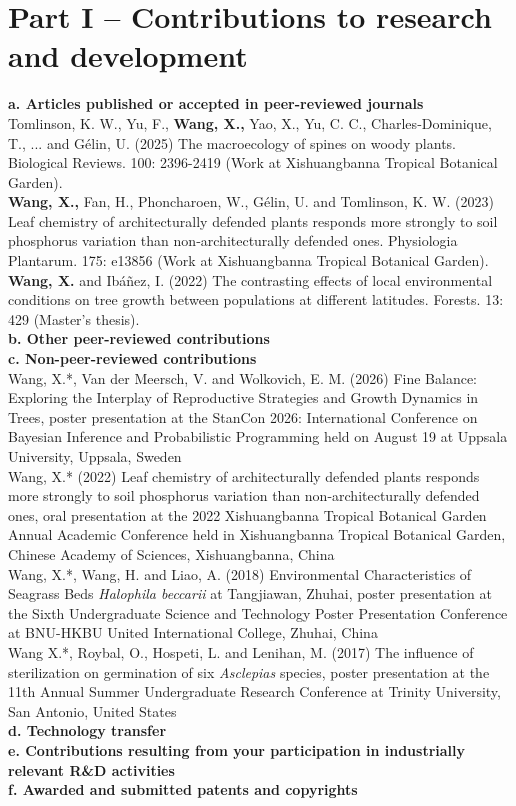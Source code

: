 \documentclass[12pt]{article}
\begin{document}
\section*{Part I – Contributions to research and development}
\textbf{a. Articles published or accepted in peer-reviewed journals}\\
\medskip
Tomlinson, K. W., Yu, F., \textbf{Wang, X.,} Yao, X., Yu, C. C., Charles‐Dominique, T., ... and Gélin, U. (2025) The macroecology of spines on woody plants. Biological Reviews. 100: 2396-2419 (Work at Xishuangbanna Tropical Botanical Garden). \\
\medskip
\textbf{Wang, X.,} Fan, H., Phoncharoen, W., Gélin, U. and Tomlinson, K. W. (2023) Leaf chemistry of architecturally defended plants responds more strongly to soil phosphorus variation than non‐architecturally defended ones. Physiologia Plantarum. 175: e13856 (Work at Xishuangbanna Tropical Botanical Garden).\\
\medskip
\textbf{Wang, X.} and Ibáñez, I. (2022) The contrasting effects of local environmental conditions on tree growth between populations at different latitudes. Forests. 13: 429 (Master's thesis).\\
\medskip
\textbf{b. Other peer-reviewed contributions}\\
\textbf{c. Non-peer-reviewed contributions}\\
\medskip
Wang, X.*, Van der Meersch, V. and Wolkovich, E. M. (2026) Fine Balance: Exploring the Interplay of Reproductive Strategies and Growth Dynamics in Trees, poster presentation at the StanCon 2026: International Conference on Bayesian Inference and Probabilistic Programming held on August 19 at Uppsala University, Uppsala, Sweden\\
Wang, X.* (2022) Leaf chemistry of architecturally defended plants responds more strongly to soil phosphorus variation than non-architecturally defended ones, oral presentation at the 2022 Xishuangbanna Tropical Botanical Garden Annual Academic Conference held in Xishuangbanna Tropical Botanical Garden, Chinese Academy of Sciences, Xishuangbanna, China\\
\medskip
Wang, X.*, Wang, H. and Liao, A. (2018) Environmental Characteristics of Seagrass Beds \textit{Halophila beccarii} at Tangjiawan, Zhuhai, poster presentation at the Sixth Undergraduate Science and Technology Poster Presentation Conference at BNU-HKBU United International College, Zhuhai, China\\
\medskip
Wang X.*, Roybal, O., Hospeti, L. and Lenihan, M. (2017) The influence of sterilization on germination of six \textit{Asclepias} species, poster presentation at the 11th Annual Summer Undergraduate Research Conference at Trinity University, San Antonio, United States\\
\medskip
\textbf{d. Technology transfer}\\
\textbf{e. Contributions resulting from your participation in industrially relevant R\&D activities}\\
\textbf{f. Awarded and submitted patents and copyrights}\\
\end{document}
